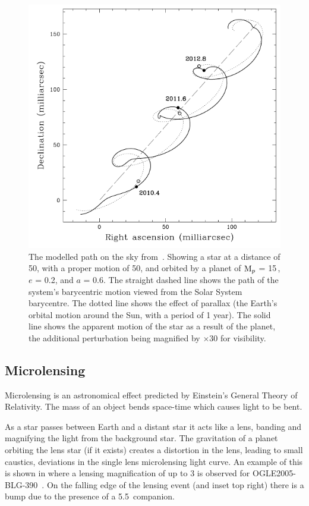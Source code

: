 \begin{figure}
    \centering
    \includegraphics[width=0.5\linewidth]{./figures/introduction/Astrometry_Perryman2000.png}
    \caption{The modelled path on the sky from~\citet{perryman_extrasolar_2000}. Showing a star at a distance of 50\pc, with a proper motion of 50\masperyr{}, 
        and orbited by a planet of $\textrm{M}_{p}$ = 15\,\Mjup{}, $e$ = 0.2, and $a$ = 0.6\AU{}.
        The straight dashed line shows the path of the system's barycentric motion viewed from the Solar System barycentre. 
        The dotted line shows the effect of parallax (the Earth's orbital motion around the Sun, with a period of 1 year).
       The solid line shows the apparent motion of the star as a result of the planet, the additional perturbation being magnified by $\times 30$ for visibility.
    }
    \label{fig:astrometry_perryman}
\end{figure}


\subsection{Microlensing}
\label{sub:microlensing}
Microlensing is an astronomical effect predicted by Einstein's General Theory of Relativity.
The mass of an object bends space-time which causes light to be bent.

As a star passes between Earth and a distant star it acts like a lens, banding and magnifying the light from the background star.
The gravitation of a planet orbiting the lens star (if it exists) creates a distortion in the lens, leading to small caustics, deviations in the single lens microlensing light curve. An example of this is shown in  where a lensing magnification of up to 3 is observed for {OGLE2005-BLG-390}~\citep{beaulieu_discovery_2006}. On the falling edge of the lensing event (and inset top right) there is a bump due to the presence of a 5.5\,\Mjup{} companion.

